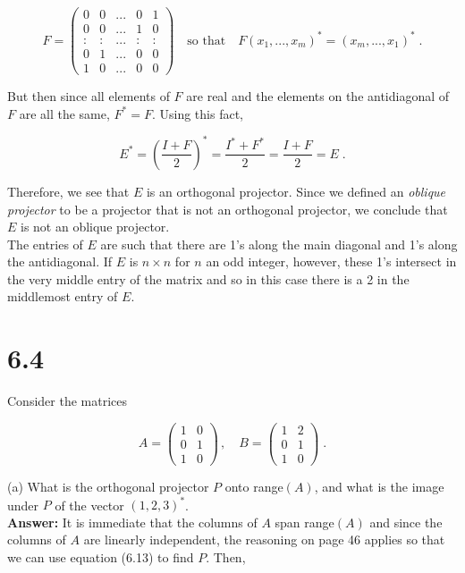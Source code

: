 \documentclass[11pt]{article}
\begin{document}
$$F = \begin{pmatrix}
0&0&...&0&1\\ 0&0&...&1&0\\ :&:&...&:&:\\ 0&1&...&0&0 \\ 1&0&...&0&0
\end{pmatrix} \quad \text{so that}\quad F(x_1,...,x_m)^* = (x_m,...,x_1)^* \;.$$

But then since all elements of $F$ are real and the elements on the antidiagonal of $F$ are all the same, $F^* = F$. Using this fact,

$$E^* = \left(\frac{I+F}{2}\right)^* = \frac{I^* + F^*}{2} = \frac{I+F}{2} = E \;.$$

Therefore, we see that $E$ is an orthogonal projector. Since we defined an \textit{oblique projector} to be a projector that is not an orthogonal projector, we conclude that $E$ is not an oblique projector. \\

The entries of $E$ are such that there are 1's along the main diagonal and 1's along the antidiagonal. If $E$ is $n \times n$ for $n$ an odd integer, however, these 1's intersect in the very middle entry of the matrix and so in this case there is a 2 in the middlemost entry of $E$. 

\section*{6.4}

Consider the matrices

$$A = \begin{pmatrix}
1 & 0 \\ 0 & 1 \\ 1 & 0
\end{pmatrix}\, , \quad B = \begin{pmatrix}
1 & 2 \\ 0 & 1 \\ 1 & 0
\end{pmatrix} \; .$$

(a) What is the orthogonal projector $P$ onto range$(A)$, and what is the image under $P$ of the vector $(1,2,3)^*$. \\

\textbf{Answer:} It is immediate that the columns of $A$ span range$(A)$ and since the columns of $A$ are linearly independent, the reasoning on page 46 applies so that we can use equation (6.13) to find $P$. Then,
\end{document}
